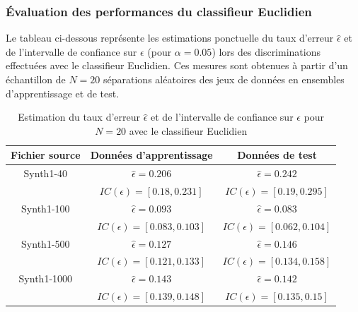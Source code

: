 \documentclass[a4paper,10pt]{report}
\begin{document}
\subsubsection{Évaluation des performances du classifieur Euclidien}

Le tableau ci-dessous représente les estimations ponctuelle du taux d'erreur $\hat{\epsilon}$ et de l'intervalle de confiance sur $\epsilon$ (pour $\alpha = 0.05$) lors des discriminations effectuées avec le classifieur Euclidien. Ces mesures sont obtenues à partir d'un échantillon de $N = 20$ séparations aléatoires des jeux de données en ensembles d'apprentissage et de test.

\begin{table}[H]
	\centering
	\captionsetup{justification=centering, margin=4cm}
	\begin{tabular}{c|c|c}
		Fichier source & Données d'apprentissage & Données de test \\ 
		\hline
		\small Synth1-40 & $ \hat{\epsilon} = 0.206 $  &  $ \hat{\epsilon} = 0.242 $ \\
						&  $ IC(\epsilon) = [ 0.18 , 0.231 ] $  & $ IC(\epsilon) = [ 0.19 , 0.295 ] $ \\ 
		\hline
		\small Synth1-100 & $ \hat{\epsilon} = 0.093 $  &  $ \hat{\epsilon} = 0.083 $ \\
		&  $ IC(\epsilon) = [ 0.083 , 0.103 ] $  & $ IC(\epsilon) = [ 0.062 , 0.104 ] $ \\ 
		\hline
		\small Synth1-500 & $ \hat{\epsilon} = 0.127 $  &  $ \hat{\epsilon} = 0.146 $ \\
		&  $ IC(\epsilon) = [ 0.121 , 0.133 ] $  & $ IC(\epsilon) = [ 0.134 , 0.158 ] $ \\ 
		\hline
		\small Synth1-1000 & $ \hat{\epsilon} = 0.143 $  &  $ \hat{\epsilon} = 0.142 $ \\
		&  $ IC(\epsilon) = [ 0.139 , 0.148 ] $  & $ IC(\epsilon) = [ 0.135 , 0.15 ] $ \\ 
	\end{tabular}
	\caption{\small Estimation du taux d'erreur $\hat{\epsilon}$ et de l'intervalle de confiance sur $\epsilon$ pour $N = 20$ avec le classifieur Euclidien}
	\label{table:1-2-error-rate-Synth1-N-20-ceuc}
\end{table}
\end{document}
